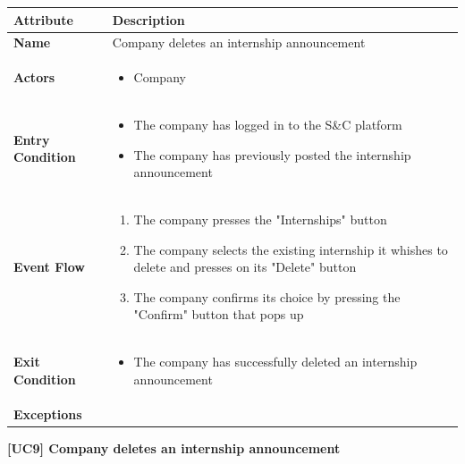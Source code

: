 \begin{center}
    \begin{tabular}{|p{3cm}|p{9cm}|}
    \hline
    \textbf{Attribute} & \textbf{Description} \\ \hline
    \textbf{Name} & Company deletes an internship announcement \\ \hline
    \textbf{Actors} & 
    \begin{itemize}
        \item Company
    \end{itemize} \\ \hline
    \textbf{Entry Condition} & 
    \begin{itemize}
        \item The company has logged in to the S\&C platform
        \item The company has previously posted the internship announcement
    \end{itemize}\\ \hline
    \textbf{Event Flow} & 
    \begin{enumerate}
        \item The company presses the "Internships" button 
        \item The company selects the existing internship it whishes to delete and presses on its "Delete" button
        \item The company confirms its choice by pressing the "Confirm" button that pops up
    \end{enumerate} \\ \hline
    \textbf{Exit Condition} &
    \begin{itemize}
        \item The company has successfully deleted an internship announcement
    \end{itemize} \\ \hline
    \textbf{Exceptions} & 
 \\ \hline
    \end{tabular}
    \newline
    \newline
    \textbf{[UC9] Company deletes an internship announcement}
    \newline
    \newline
    

\end{center}
